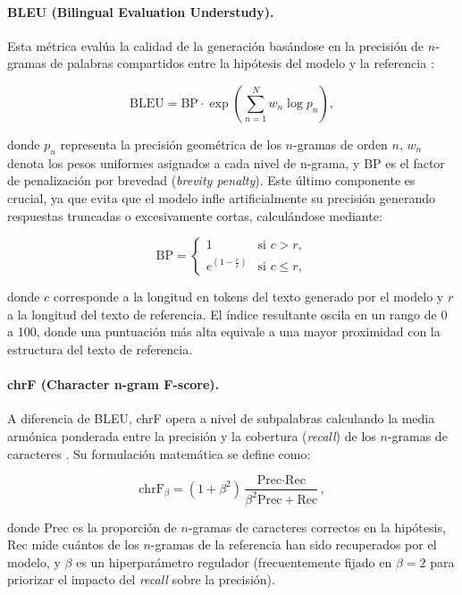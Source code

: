 \paragraph{BLEU (Bilingual Evaluation Understudy).} Esta métrica evalúa la calidad de la generación basándose en la precisión de $n$-gramas de palabras compartidos entre la hipótesis del modelo y la referencia \cite{papineni-etal-2002-bleu}:

\[
\text{BLEU} = \text{BP} \cdot \exp\left( \sum_{n=1}^N w_n \log p_n \right),
\]

donde $p_n$ representa la precisión geométrica de los $n$-gramas de orden $n$, $w_n$ denota los pesos uniformes asignados a cada nivel de n-grama, y $\text{BP}$ es el factor de penalización por brevedad (\emph{brevity penalty}). Este último componente es crucial, ya que evita que el modelo infle artificialmente su precisión generando respuestas truncadas o excesivamente cortas, calculándose mediante:

\[
\text{BP} = \begin{cases} 
1 & \text{si } c > r, \\ 
e^{\left(1 - \frac{r}{c}\right)} & \text{si } c \le r,
\end{cases}
\]

donde $c$ corresponde a la longitud en tokens del texto generado por el modelo y $r$ a la longitud del texto de referencia. El índice resultante oscila en un rango de 0 a 100, donde una puntuación más alta equivale a una mayor proximidad con la estructura del texto de referencia.

\paragraph{chrF (Character n-gram F-score).} A diferencia de BLEU, chrF opera a nivel de subpalabras calculando la media armónica ponderada entre la precisión y la cobertura (\emph{recall}) de los $n$-gramas de caracteres \cite{popovic-2015-chrf}. Su formulación matemática se define como:

\[
\text{chrF}_\beta = (1+\beta^2)\frac{\text{Prec}\cdot\text{Rec}}{\beta^2\text{Prec}+\text{Rec}},
\]

donde $\text{Prec}$ es la proporción de $n$-gramas de caracteres correctos en la hipótesis, $\text{Rec}$ mide cuántos de los $n$-gramas de la referencia han sido recuperados por el modelo, y $\beta$ es un hiperparámetro regulador (frecuentemente fijado en $\beta=2$ para priorizar el impacto del \emph{recall} sobre la precisión). 

